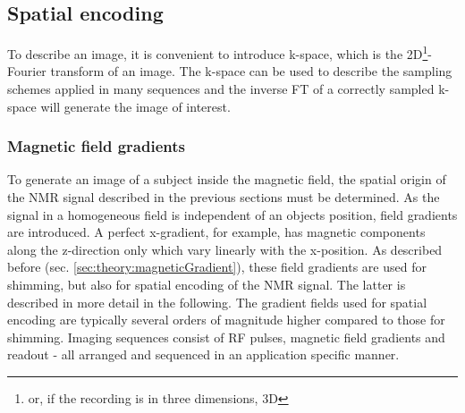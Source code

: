        \subsection{Spatial encoding}
            To describe an image, it is convenient to introduce k-space, which is the 2D\footnote[1]{or, if the recording is in three dimensions, 3D}-Fourier transform of an image. The k-space can be used to describe the sampling schemes applied in many sequences and the inverse FT of a correctly sampled k-space will generate the image of interest.
        \subsubsection{Magnetic field gradients}
        To generate an image of a subject inside the magnetic field, the spatial origin of the NMR signal described in the previous sections must be determined. As the signal in a homogeneous field is independent of an objects position, field gradients are introduced. A perfect x-gradient, for example, has magnetic components along the z-direction only which vary linearly with the x-position. As described before (sec. \ref{sec:theory:magneticGradient}), these field gradients are used for shimming, but also for spatial encoding of the NMR signal. The latter is described in more detail in the following. The gradient fields used for spatial encoding are typically several orders of magnitude higher compared to those for shimming. Imaging sequences consist of RF pulses, magnetic field gradients and readout - all arranged and sequenced in an application specific manner.
